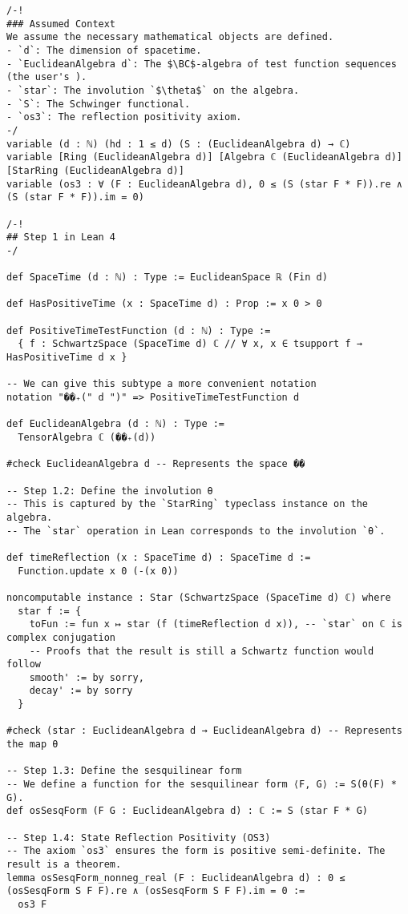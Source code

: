 \documentclass{article}
\newcommand{\1}{\mathbbm{1}}
\theoremstyle{plain}
\theoremstyle{definition}
\numberwithin{equation}{section}
\begin{document}
\begin{lstlisting}
/-!
### Assumed Context
We assume the necessary mathematical objects are defined.
- `d`: The dimension of spacetime.
- `EuclideanAlgebra d`: The $\BC$-algebra of test function sequences (the user's ).
- `star`: The involution `$\theta$` on the algebra.
- `S`: The Schwinger functional.
- `os3`: The reflection positivity axiom.
-/
variable (d : ℕ) (hd : 1 ≤ d) (S : (EuclideanAlgebra d) → ℂ)
variable [Ring (EuclideanAlgebra d)] [Algebra ℂ (EuclideanAlgebra d)] [StarRing (EuclideanAlgebra d)]
variable (os3 : ∀ (F : EuclideanAlgebra d), 0 ≤ (S (star F * F)).re ∧ (S (star F * F)).im = 0)

/-!
## Step 1 in Lean 4
-/

def SpaceTime (d : ℕ) : Type := EuclideanSpace ℝ (Fin d)

def HasPositiveTime (x : SpaceTime d) : Prop := x 0 > 0

def PositiveTimeTestFunction (d : ℕ) : Type :=
  { f : SchwartzSpace (SpaceTime d) ℂ // ∀ x, x ∈ tsupport f → HasPositiveTime d x }

-- We can give this subtype a more convenient notation
notation "��₊(" d ")" => PositiveTimeTestFunction d

def EuclideanAlgebra (d : ℕ) : Type :=
  TensorAlgebra ℂ (��₊(d))

#check EuclideanAlgebra d -- Represents the space ��

-- Step 1.2: Define the involution θ
-- This is captured by the `StarRing` typeclass instance on the algebra.
-- The `star` operation in Lean corresponds to the involution `θ`.

def timeReflection (x : SpaceTime d) : SpaceTime d :=
  Function.update x 0 (-(x 0))

noncomputable instance : Star (SchwartzSpace (SpaceTime d) ℂ) where
  star f := {
    toFun := fun x ↦ star (f (timeReflection d x)), -- `star` on ℂ is complex conjugation
    -- Proofs that the result is still a Schwartz function would follow
    smooth' := by sorry,
    decay' := by sorry
  }
  
#check (star : EuclideanAlgebra d → EuclideanAlgebra d) -- Represents the map θ

-- Step 1.3: Define the sesquilinear form
-- We define a function for the sesquilinear form ⟨F, G⟩ := S(θ(F) * G).
def osSesqForm (F G : EuclideanAlgebra d) : ℂ := S (star F * G)

-- Step 1.4: State Reflection Positivity (OS3)
-- The axiom `os3` ensures the form is positive semi-definite. The result is a theorem.
lemma osSesqForm_nonneg_real (F : EuclideanAlgebra d) : 0 ≤ (osSesqForm S F F).re ∧ (osSesqForm S F F).im = 0 :=
  os3 F


\end{lstlisting}
\end{document}
